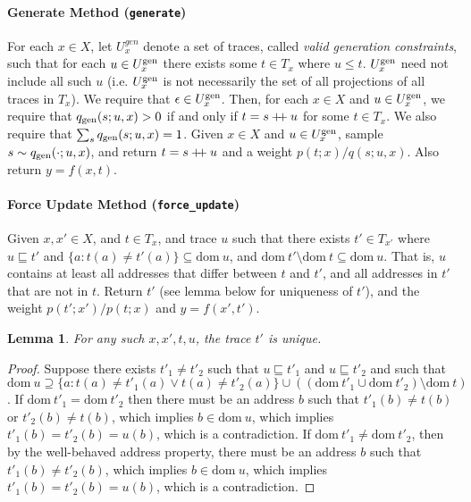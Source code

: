 \documentclass{article}
\newtheorem{lemma}[theorem]{Lemma}
\newcommand{\code}[1]{\texttt{\small{\textbf{#1}}}}
\newcommand\doubleplus{\mathbin{+\mkern-5mu+}}
\newcommand{\concat}[0]{\doubleplus}
\newcommand{\dom}[1]{\mbox{dom}{~#1}}
\newcommand{\emptytrace}[0]{\epsilon}
\newcommand{\gen}[0]{\mbox{\scriptsize gen}}
\newcommand{\contained}[0]{\sqsubseteq}
\begin{document}

\paragraph{Generate Method (\code{generate})}
For each $x \in X$, let $U^{gen}_x$ denote a set of traces, called \emph{valid generation constraints}, such that for each $u \in U^{\gen}_x$ there exists some $t \in T_x$ where $u \le t$.
$U^{\gen}_x$ need not include all such $u$ (i.e. $U^{\gen}_x$ is not necessarily the set of all projections of all traces in $T_x$).
We require that $\emptytrace \in U^{\gen}_x$.
Then, for each $x \in X$ and $u \in U^{\gen}_x$, we require that $q_{\gen}(s; u, x) > 0$ if and only if $t = s \concat u$ for some $t \in T_x$.
We also require that $\sum_s q_{\gen}(s; u, x) = 1$.
Given $x \in X$ and $u \in U^{\gen}_x$, sample $s \sim q_{\gen}(\cdot; u, x)$, and return $t = s \concat u$ and a weight $p(t; x) / q(s; u, x)$.
Also return $y = f(x, t)$.


\paragraph{Force Update Method (\code{force\_update})}
Given $x, x' \in X$, and $t \in T_x$, and trace $u$ such that there exists $t' \in T_{x'}$ where $u \contained t'$ and $\{ a: t(a) \ne t'(a)\} \subseteq \dom{u}$, and $\dom{t'} \setminus \dom{t} \subseteq \dom{u}$.
That is, $u$ contains at least all addresses that differ between $t$ and $t'$, and all addresses in $t'$ that are not in $t$.
Return $t'$ (see lemma below for uniqueness of $t'$), and the weight $p(t'; x') / p(t; x)$ and $y = f(x', t')$.

\begin{lemma}
For any such $x, x', t, u$, the trace $t'$ is unique.
\end{lemma}
\begin{proof}
Suppose there exists $t'_1 \ne t'_2$ such that $u \contained t'_1$ and $u \contained t'_2$ and such that $\dom{u} \supseteq \{a : t(a) \ne t'_1(a) \lor t(a) \ne t'_2(a)\} \cup ((\dom{t'_1} \cup \dom{t'_2}) \setminus \dom{t})$.
If $\dom{t'_1} = \dom{t'_2}$ then there must be an address $b$ such that $t'_1(b) \ne t(b)$ or $t'_2(b) \ne t(b)$, which implies $b \in \dom{u}$, which implies $t'_1(b) = t'_2(b) = u(b)$, which is a contradiction.
If $\dom{t'_1} \ne \dom{t'_2}$, then by the well-behaved address property, there must be an address $b$ such that $t'_1(b) \ne t'_2(b)$, which implies $b \in \dom{u}$, which implies $t'_1(b) = t'_2(b) = u(b)$, which is a contradiction.
\end{proof}
\end{document}
